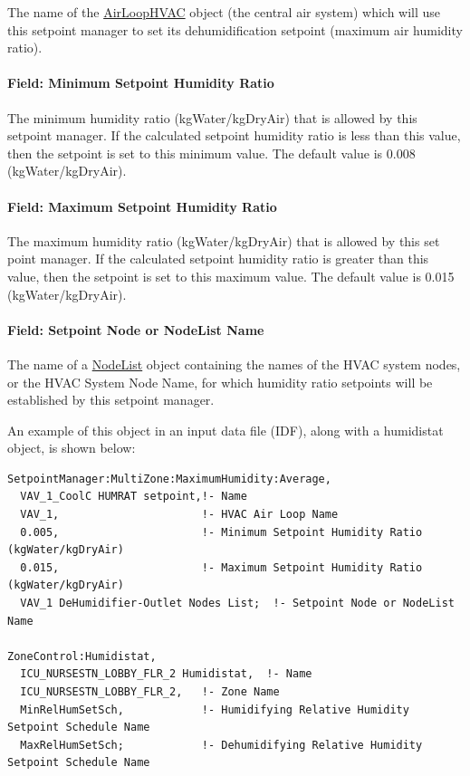 The name of the \hyperref[airloophvac]{AirLoopHVAC} object (the central air system) which will use this setpoint manager to set its dehumidification setpoint (maximum air humidity ratio).

\paragraph{Field: Minimum Setpoint Humidity Ratio}\label{field-minimum-setpoint-humidity-ratio-2}

The minimum humidity ratio (kgWater/kgDryAir) that is allowed by this setpoint manager. If the calculated setpoint humidity ratio is less than this value, then the setpoint is set to this minimum value. The default value is 0.008 (kgWater/kgDryAir).

\paragraph{Field: Maximum Setpoint Humidity Ratio}\label{field-maximum-setpoint-humidity-ratio-2}

The maximum humidity ratio (kgWater/kgDryAir) that is allowed by this set point manager. If the calculated setpoint humidity ratio is greater than this value, then the setpoint is set to this maximum value. The default value is 0.015 (kgWater/kgDryAir).

\paragraph{Field: Setpoint Node or NodeList Name}\label{field-setpoint-node-or-nodelist-name-16}

The name of a \hyperref[nodelist]{NodeList} object containing the names of the HVAC system nodes, or the HVAC System Node Name, for which humidity ratio setpoints will be established by this setpoint manager.

An example of this object in an input data file (IDF), along with a humidistat object, is shown below:

\begin{lstlisting}
SetpointManager:MultiZone:MaximumHumidity:Average,
  VAV_1_CoolC HUMRAT setpoint,!- Name
  VAV_1,                      !- HVAC Air Loop Name
  0.005,                      !- Minimum Setpoint Humidity Ratio (kgWater/kgDryAir)
  0.015,                      !- Maximum Setpoint Humidity Ratio (kgWater/kgDryAir)
  VAV_1 DeHumidifier-Outlet Nodes List;  !- Setpoint Node or NodeList Name

ZoneControl:Humidistat,
  ICU_NURSESTN_LOBBY_FLR_2 Humidistat,  !- Name
  ICU_NURSESTN_LOBBY_FLR_2,   !- Zone Name
  MinRelHumSetSch,            !- Humidifying Relative Humidity Setpoint Schedule Name
  MaxRelHumSetSch;            !- Dehumidifying Relative Humidity Setpoint Schedule Name
\end{lstlisting}

